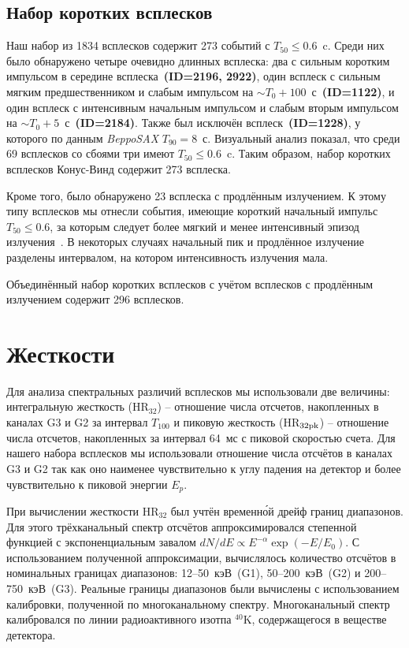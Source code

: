 \subsection{Набор коротких всплесков}
Наш набор из 1834 всплесков содержит 273 событий с $T_{50} \leq 0.6$~c. Среди них было обнаружено четыре очевидно длинных всплеска: два с сильным коротким импульсом в середине всплеска~\textbf{(ID=2196, 2922)}, один всплеск с сильным мягким предшественником и слабым импульсом на $\sim T_0+100$~с~\textbf{(ID=1122)}, и один всплеск с интенсивным начальным импульсом и слабым вторым импульсом на $\sim T_0+5$~с~\textbf{(ID=2184)}. Также был исключён всплеск~\textbf{(ID=1228)}, у которого по данным \textit{BeppoSAX} $T_{90} = 8$~с. Визуальный анализ показал, что среди 69 всплесков со сбоями три имеют $T_{50} \leq 0.6$~c. Таким образом, набор коротких всплесков Конус-Винд содержит 273 всплеска.

Кроме того, было обнаружено 23 всплеска с продлённым излучением. К этому типу всплесков мы отнесли события, имеющие короткий начальный импульс $T_{50} \leq 0.6$, за которым следует более мягкий и менее интенсивный эпизод излучения~\citep{Frederiks_2004_EE, Norris2011, Norris_and_Bonnel_2006}. В некоторых случаях начальный пик и продлённое излучение разделены интервалом, на котором интенсивность излучения мала.

Объединённый набор коротких всплесков с учётом всплесков с продлённым излучением содержит 296 всплесков.

\clearpage

\section{Жесткости}\label{sec:Hardness}
Для анализа спектральных различий всплесков мы использовали две величины: интегральную жесткость (HR$_{32}$) -- отношение числа отсчетов, накопленных в каналах G3 и G2 за интервал $T_{100}$ и пиковую жесткость (HR$_{32\mbox{\scriptsize pk}}$) -- отношение числа отсчетов, накопленных за интервал 64~мс с пиковой скоростью счета. Для нашего набора всплесков мы использовали отношение числа отсчётов в каналах G3 и G2 так как оно наименее чувствительно к углу падения на детектор и более чувствительно к пиковой энергии $E_p$.  

При вычислении жесткости HR$_{32}$ был учтён временн\'{о}й дрейф границ диапазонов. Для этого трёхканальный спектр отсчётов аппроксимировался степенной функцией с экспоненциальным завалом $dN/dE \propto E^{-\alpha} \exp(-E/E_0)$. С использованием полученной аппроксимации, вычислялось количество отсчётов в номинальных границах диапазонов: 12--50~кэВ~(G1), 50--200~кэВ~(G2) и 200--750~кэВ~(G3). Реальные границы диапазонов были вычислены с использованием калибровки, полученной  по многоканальному спектру.  Многоканальный спектр калибровался по линии радиоактивного изотпа $^{40}$K, содержащегося в веществе детектора.

